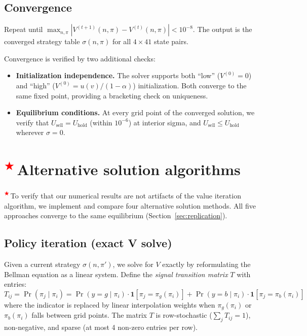 \documentclass[11pt]{article}
\newcommand{\extension}{\textsuperscript{\textcolor{red}{$\bigstar$}}\,}
\begin{document}
\subsection{Convergence}

Repeat until $\max_{n,\pi} |V^{(t+1)}(n,\pi) - V^{(t)}(n,\pi)| < 10^{-8}$.
The output is the converged strategy table $\sigma(n, \pi)$ for all
$4 \times 41$ state pairs.

Convergence is verified by two additional checks:
\begin{itemize}
    \item \textbf{Initialization independence.} The solver supports both
    ``low'' ($V^{(0)} = 0$) and ``high''
    ($V^{(0)} = u(v)/(1-\alpha)$) initialization. Both converge to the
    same fixed point, providing a bracketing check on uniqueness.
    \item \textbf{Equilibrium conditions.} At every grid point of the
    converged solution, we verify that $U_{\text{sell}} = U_{\text{hold}}$
    (within $10^{-6}$) at interior sigma, and $U_{\text{sell}} \leq
    U_{\text{hold}}$ wherever $\sigma = 0$.
\end{itemize}

\section{\extension Alternative solution algorithms}\label{sec:alt_algorithms}

\extension To verify that our numerical results are not artifacts of the
value iteration algorithm, we implement and compare four alternative
solution methods. All five approaches converge to the same equilibrium
(Section~\ref{sec:replication}).

\subsection{Policy iteration (exact V solve)}

Given a current strategy $\sigma(n, \pi')$, we solve for $V$ exactly by
reformulating the Bellman equation as a linear system. Define the
\textit{signal transition matrix} $T$ with entries:
\begin{equation}
    T_{ij} = \Pr(\pi_j \mid \pi_i)
    = \Pr(y{=}g \mid \pi_i) \cdot \mathbf{1}[\pi_j = \pi_g(\pi_i)]
    + \Pr(y{=}b \mid \pi_i) \cdot \mathbf{1}[\pi_j = \pi_b(\pi_i)]
    \label{eq:transition_matrix}
\end{equation}
where the indicator is replaced by linear interpolation weights when
$\pi_g(\pi_i)$ or $\pi_b(\pi_i)$ falls between grid points. The matrix $T$
is row-stochastic ($\sum_j T_{ij} = 1$), non-negative, and sparse (at most
4 non-zero entries per row).
\end{document}
